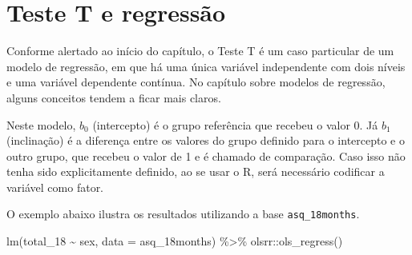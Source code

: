 \documentclass[
]{book}
\newenvironment{Shaded}{\begin{snugshade}}{\end{snugshade}}
\newcommand{\AttributeTok}[1]{\textcolor[rgb]{0.77,0.63,0.00}{#1}}
\newcommand{\FunctionTok}[1]{\textcolor[rgb]{0.00,0.00,0.00}{#1}}
\newcommand{\NormalTok}[1]{#1}
\newcommand{\SpecialCharTok}[1]{\textcolor[rgb]{0.00,0.00,0.00}{#1}}
\begin{document}
\hypertarget{teste-t-e-regressuxe3o}{%
\section{Teste T e regressão}\label{teste-t-e-regressuxe3o}}

Conforme alertado ao início do capítulo, o Teste T é um caso particular de um modelo de regressão, em que há uma única variável independente com dois níveis e uma variável dependente contínua. No capítulo sobre modelos de regressão, alguns conceitos tendem a ficar mais claros.

Neste modelo, \(b_0\) (intercepto) é o grupo referência que recebeu o valor 0. Já \(b_1\) (inclinação) é a diferença entre os valores do grupo definido para o intercepto e o outro grupo, que recebeu o valor de 1 e é chamado de comparação. Caso isso não tenha sido explicitamente definido, ao se usar o R, será necessário codificar a variável como fator.

O exemplo abaixo ilustra os resultados utilizando a base \texttt{asq\_18months}.

\begin{Shaded}
\begin{Highlighting}[]
\FunctionTok{lm}\NormalTok{(total\_18 }\SpecialCharTok{\textasciitilde{}}\NormalTok{ sex, }\AttributeTok{data =}\NormalTok{ asq\_18months) }\SpecialCharTok{\%\textgreater{}\%}
\NormalTok{  olsrr}\SpecialCharTok{::}\FunctionTok{ols\_regress}\NormalTok{()}
\end{Highlighting}
\end{Shaded}
\end{document}

